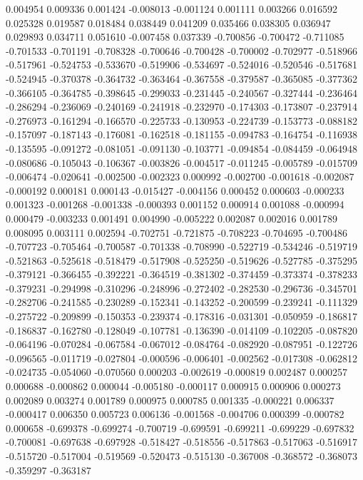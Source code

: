 0.004954
0.009336
0.001424
-0.008013
-0.001124
0.001111
0.003266
0.016592
0.025328
0.019587
0.018484
0.038449
0.041209
0.035466
0.038305
0.036947
0.029893
0.034711
0.051610
-0.007458
0.037339
-0.700856
-0.700472
-0.711085
-0.701533
-0.701191
-0.708328
-0.700646
-0.700428
-0.700002
-0.702977
-0.518966
-0.517961
-0.524753
-0.533670
-0.519906
-0.534697
-0.524016
-0.520546
-0.517681
-0.524945
-0.370378
-0.364732
-0.363464
-0.367558
-0.379587
-0.365085
-0.377362
-0.366105
-0.364785
-0.398645
-0.299033
-0.231445
-0.240567
-0.327444
-0.236464
-0.286294
-0.236069
-0.240169
-0.241918
-0.232970
-0.174303
-0.173807
-0.237914
-0.276973
-0.161294
-0.166570
-0.225733
-0.130953
-0.224739
-0.153773
-0.088182
-0.157097
-0.187143
-0.176081
-0.162518
-0.181155
-0.094783
-0.164754
-0.116938
-0.135595
-0.091272
-0.081051
-0.091130
-0.103771
-0.094854
-0.084459
-0.064948
-0.080686
-0.105043
-0.106367
-0.003826
-0.004517
-0.011245
-0.005789
-0.015709
-0.006474
-0.020641
-0.002500
-0.002323
0.000992
-0.002700
-0.001618
-0.002087
-0.000192
0.000181
0.000143
-0.015427
-0.004156
0.000452
0.000603
-0.000233
0.001323
-0.001268
-0.001338
-0.000393
0.001152
0.000914
0.001088
-0.000994
0.000479
-0.003233
0.001491
0.004990
-0.005222
0.002087
0.002016
0.001789
0.008095
0.003111
0.002594
-0.702751
-0.721875
-0.708223
-0.704695
-0.700486
-0.707723
-0.705464
-0.700587
-0.701338
-0.708990
-0.522719
-0.534246
-0.519719
-0.521863
-0.525618
-0.518479
-0.517908
-0.525250
-0.519626
-0.527785
-0.375295
-0.379121
-0.366455
-0.392221
-0.364519
-0.381302
-0.374459
-0.373374
-0.378233
-0.379231
-0.294998
-0.310296
-0.248996
-0.272402
-0.282530
-0.296736
-0.345701
-0.282706
-0.241585
-0.230289
-0.152341
-0.143252
-0.200599
-0.239241
-0.111329
-0.275722
-0.209899
-0.150353
-0.239374
-0.178316
-0.031301
-0.050959
-0.186817
-0.186837
-0.162780
-0.128049
-0.107781
-0.136390
-0.014109
-0.102205
-0.087820
-0.064196
-0.070284
-0.067584
-0.067012
-0.084764
-0.082920
-0.087951
-0.122726
-0.096565
-0.011719
-0.027804
-0.000596
-0.006401
-0.002562
-0.017308
-0.062812
-0.024735
-0.054060
-0.070560
0.000203
-0.002619
-0.000819
0.002487
0.000257
0.000688
-0.000862
0.000044
-0.005180
-0.000117
0.000915
0.000906
0.000273
0.002089
0.003274
0.001789
0.000975
0.000785
0.001335
-0.000221
0.006337
-0.000417
0.006350
0.005723
0.006136
-0.001568
-0.004706
0.000399
-0.000782
0.000658
-0.699378
-0.699274
-0.700719
-0.699591
-0.699211
-0.699229
-0.697832
-0.700081
-0.697638
-0.697928
-0.518427
-0.518556
-0.517863
-0.517063
-0.516917
-0.515720
-0.517004
-0.519569
-0.520473
-0.515130
-0.367008
-0.368572
-0.368073
-0.359297
-0.363187

